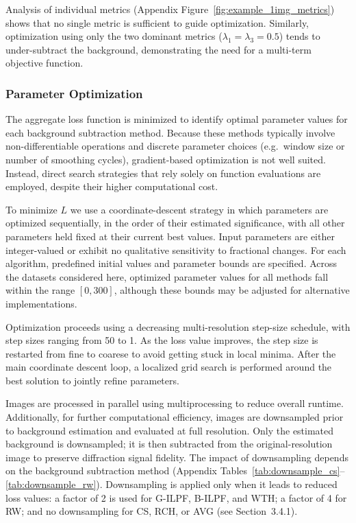 \documentclass[iucr]{iucrjournals}
\begin{document}
Analysis of individual metrics (Appendix Figure~\ref{fig:example_1img_metrics}) shows that no single metric is sufficient to guide optimization. Similarly, optimization using only the two dominant metrics ($\lambda_1 = \lambda_3 = 0.5$) tends to under-subtract the background, demonstrating the need for a multi-term objective function.


\subsubsection{Parameter Optimization}

The aggregate loss function is minimized to identify optimal parameter values for each background subtraction method. Because these methods typically involve non-differentiable operations and discrete parameter choices (e.g.\ window size or number of smoothing cycles), gradient-based optimization is not well suited. Instead, direct search strategies that rely solely on function evaluations are employed, despite their higher computational cost.

To minimize $L$ we use a coordinate-descent strategy in which parameters are optimized sequentially, in the order of their estimated significance, with all other parameters held fixed at their current best values. Input parameters are either integer-valued or exhibit no qualitative sensitivity to fractional changes. For each algorithm, predefined initial values and parameter bounds are specified. Across the datasets considered here, optimized parameter values for all methods fall within the range $[0, 300]$, although these bounds may be adjusted for alternative implementations.

Optimization proceeds using a decreasing multi-resolution step-size schedule, with step sizes ranging from 50 to 1. As the loss value improves, the step size is restarted from fine to coarese to avoid getting stuck in local minima. After the main coordinate descent loop, a localized grid search is performed around the best solution to jointly refine parameters.

Images are processed in parallel using multiprocessing to reduce overall runtime. Additionally, for further computational efficiency, images are downsampled prior to background estimation and evaluated at full resolution. Only the estimated background is downsampled; it is then subtracted from the original-resolution image to preserve diffraction signal fidelity. The impact of downsampling depends on the background subtraction method (Appendix Tables~\ref{tab:downsample_cs}--\ref{tab:downsample_rw}). Downsampling is applied only when it leads to reduced loss values: a factor of 2 is used for G-ILPF, B-ILPF, and WTH; a factor of 4 for RW; and no downsampling for CS, RCH, or AVG (see Section~3.4.1).
\end{document}
